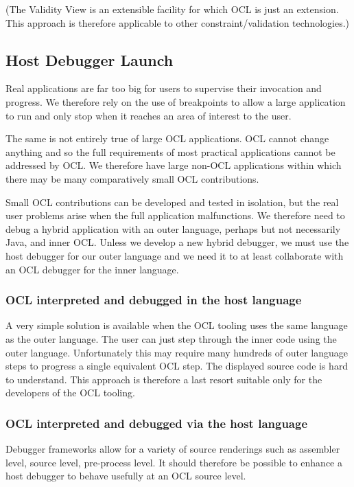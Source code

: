\documentclass[a4paper]{article}
\begin{document}
(The Validity View is an extensible facility for which OCL is just an extension. This approach is therefore applicable to other constraint/validation technologies.)

\subsection{Host Debugger Launch}

Real applications are far too big for users to supervise their invocation and progress. We therefore rely on the use of breakpoints to allow a large application to run and only stop when it reaches an area of interest to the user.

The same is not entirely true of large OCL applications. OCL cannot change anything and so the full requirements of most practical applications cannot be addressed by OCL. We therefore have large non-OCL applications within which there may be many comparatively small OCL contributions. 

Small OCL contributions can be developed and tested in isolation, but the real user problems arise when the full application malfunctions. We therefore need to debug a hybrid application with an outer language, perhaps but not necessarily Java, and inner OCL. Unless we develop a new hybrid debugger, we must use the host debugger for our outer language and we need it to at least collaborate with an OCL debugger for the inner language.

\subsubsection{OCL interpreted and debugged in the host language}

A very simple solution is available when the OCL tooling uses the same language as the outer language. The user can just step through the inner code using the outer language. Unfortunately this may require many hundreds of outer language steps to progress a single equivalent OCL step. The displayed source code is hard to understand. This approach is therefore a last resort suitable only for the developers of the OCL tooling.

\subsubsection{OCL interpreted and debugged via the host language}

Debugger frameworks allow for a variety of source renderings such as assembler level, source level, pre-process level. It should therefore be possible to enhance a host debugger to behave usefully at an OCL source level.
\end{document}
